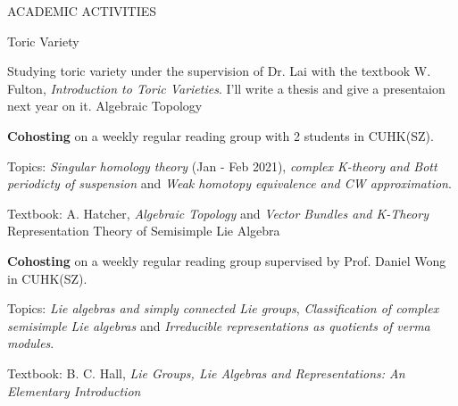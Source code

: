 \begin{rubric}{ACADEMIC ACTIVITIES}



	 Toric Variety \par
	Studying toric variety under the supervision of Dr. Lai with the textbook W. Fulton, \textit{Introduction to Toric Varieties}. I'll write a thesis and give a presentaion next year on it.
	 Algebraic Topology \par
		\textbf{Cohosting} on a weekly regular reading group with 2 students in CUHK(SZ). \par
		Topics: \textit{Singular homology theory} (Jan - Feb 2021), \textit{complex K-theory and Bott periodicty of suspension} and \textit{Weak homotopy equivalence and CW approximation}. \par
		Textbook: A. Hatcher, \textit{Algebraic Topology} and \textit{Vector Bundles and K-Theory}
	 Representation Theory of Semisimple Lie Algebra \par
		\textbf{Cohosting} on a weekly regular reading group supervised by Prof. Daniel Wong in CUHK(SZ).\par
		Topics: \textit{Lie algebras and simply connected Lie groups}, \textit{Classification of complex semisimple Lie algebras} and \textit{Irreducible representations as quotients of verma modules}. \par
		Textbook: B. C. Hall, \textit{Lie Groups, Lie Algebras and Representations: An Elementary Introduction} 
\end{rubric}
